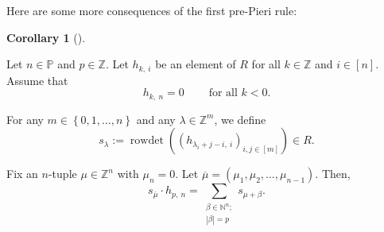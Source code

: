 \documentclass[numbers=enddot,12pt,final,onecolumn,notitlepage,english]{scrartcl}%
\theoremstyle{definition}
\newtheorem{coro}[theo]{Corollary}
\newenvironment{corollary}[1][]
{\begin{coro}[#1]\begin{leftbar}}
{\end{leftbar}\end{coro}}
\let\sumnonlimits\sum
\renewcommand{\sum}{\sumnonlimits\limits}
\begin{document}
Here are some more consequences of the first pre-Pieri rule:

\begin{corollary}
\label{cor.pre-pieri.4}Let $n\in\mathbb{P}$ and $p\in\mathbb{Z}$. Let
$h_{k,\ i}$ be an element of $R$ for all $k\in\mathbb{Z}$ and $i\in\left[
n\right]  $. Assume that%
\[
h_{k,\ n}=0\ \ \ \ \ \ \ \ \ \ \text{for all }k<0.
\]


For any $m\in\left\{  0,1,\ldots,n\right\}  $ and any $\lambda\in
\mathbb{Z}^{m}$, we define%
\[
s_{\lambda}:=\operatorname*{rowdet}\left(  \left(  h_{\lambda_{i}%
+j-i,\ i}\right)  _{i,j\in\left[  m\right]  }\right)  \in R.
\]


Fix an $n$-tuple $\mu\in\mathbb{Z}^{n}$ with $\mu_{n}=0$. Let $\overline{\mu
}=\left(  \mu_{1},\mu_{2},\ldots,\mu_{n-1}\right)  $. Then,%
\[
s_{\overline{\mu}}\cdot h_{p,\ n}=\sum_{\substack{\beta\in\mathbb{N}%
^{n};\\\left\vert \beta\right\vert =p}}s_{\mu+\beta}.
\]

\end{corollary}
\end{document}
